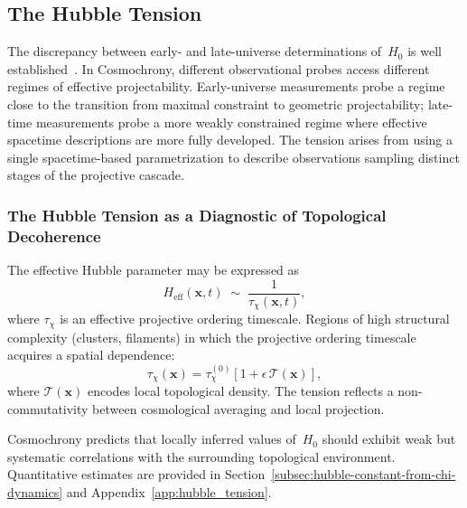 \subsection{The Hubble Tension}
  \label{subsec:hubble-tension}

  The discrepancy between early- and late-universe determinations of~$H_0$
  is well
  established~\cite{Riess2019,Riess2022,Planck2020,HubbleTensionReview}.
  In Cosmochrony, different observational probes access different regimes
  of effective projectability.
  Early-universe measurements probe a regime close to the transition from
  maximal constraint to geometric projectability; late-time measurements
  probe a more weakly constrained regime where effective spacetime
  descriptions are more fully developed.
  The tension arises from using a single spacetime-based parametrization
  to describe observations sampling distinct stages of the projective cascade.

  \subsubsection*{The Hubble Tension as a Diagnostic of Topological
  Decoherence}
    \label{subsec:hubble_tension_tau}

    The effective Hubble parameter may be expressed as
    \begin{equation}
      H_{\mathrm{eff}}(\mathbf{x}, t)
      \;\sim\; \frac{1}{\tau_\chi(\mathbf{x}, t)} ,
    \end{equation}
    where $\tau_\chi$ is an effective projective ordering timescale.
    Regions of high structural complexity (clusters, filaments) in which the projective
    ordering timescale acquires a spatial dependence:
    \begin{equation}
      \tau_\chi(\mathbf{x})
      = \tau_\chi^{(0)}
      \left[1 + \epsilon\, \mathcal{T}(\mathbf{x})\right] ,
    \end{equation}
    where $\mathcal{T}(\mathbf{x})$ encodes local topological density.
    The tension reflects a non-commutativity between cosmological averaging
    and local projection.

    Cosmochrony predicts that locally inferred values of~$H_0$ should exhibit
    weak but systematic correlations with the surrounding topological
    environment.
    Quantitative estimates are provided in
    Section~\ref{subsec:hubble-constant-from-chi-dynamics} and
    Appendix~\ref{app:hubble_tension}.
